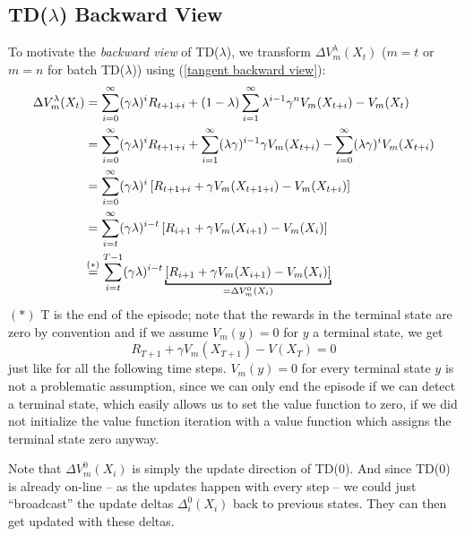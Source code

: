 \subsection{TD(\(\lambda\)) Backward View}
To motivate the \emph{backward view} of TD(\(\lambda\)), we transform \(\Delta V_m^\lambda (X_t)\) (\(m=t\) or \(m=n\) for batch TD(\(\lambda\))) using (\ref{tangent backward view}):
\begin{align}
	\Delta V_m^\lambda (X_t)&= \sum_{i=0}^\infty (\gamma\lambda)^i R_{t+1+i}
	+ (1-\lambda)\sum_{i=1}^\infty \lambda^{i-1}\gamma^n V_m(X_{t+i}) - V_m(X_t)
	\nonumber\\
	&=\sum_{i=0}^\infty (\gamma\lambda)^i R_{t+1+i} 
	+ \sum_{i=1}^\infty (\lambda\gamma)^{i-1} \gamma V_m(X_{t+i}) 
	- \sum_{i=0}^\infty (\lambda\gamma)^i V_m(X_{t+i})
	\nonumber\\
	&=\sum_{i=0}^\infty(\gamma\lambda)^i \left[
		R_{t+1+i} + \gamma V_m(X_{t+1+i}) - V_m(X_{t+i})
	\right]
	\nonumber\\
	&=\sum_{i=t}^\infty(\gamma\lambda)^{i-t} \left[
		R_{i+1} + \gamma V_m(X_{i+1}) - V_m(X_{i})
	\right]
	\nonumber\\
	&\lxeq{(*)}\sum_{i=t}^{T-1}(\gamma\lambda)^{i-t} \underbracket[1pt]{\left[
		R_{i+1} + \gamma V_m(X_{i+1}) - V_m(X_{i})
	\right]}_{
		=\Delta V^0_m(X_i)
	}\label{terminal assumptions}
\end{align}
\((*)\) T is the end of the episode; note that the rewards in the terminal state are zero by convention and if we assume \(V_m(y)=0\) for \(y\) a terminal state, we get
\[
	R_{T+1}+\gamma V_m(X_{T+1}) -V(X_T)=0
\]
just like for all the following time steps. \(V_m(y)=0\) for every terminal state \(y\) is not a problematic assumption, since we can only end the episode if we can detect a terminal state, which easily allows us to set the value function to zero, if we did not initialize the value function iteration with a value function which assigns the terminal state zero anyway. 

Note that \(\Delta V^0_m(X_i)\) is simply the update direction of TD(0). And since TD(0) is already on-line -- as the updates happen with every step -- we could just ``broadcast'' the update deltas \(\Delta_i^0(X_i)\) back to previous states. They can then get updated with these deltas.

